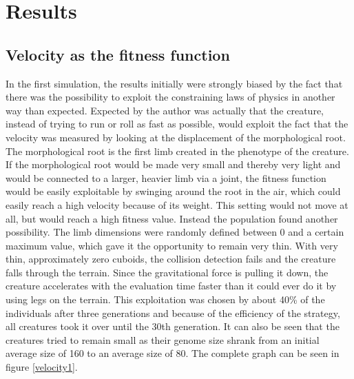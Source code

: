 \documentclass[letterpaper, 10 pt, conference]{ieeeconf}  %
\begin{document}
\section{Results}

\subsection{Velocity as the fitness function}

In the first simulation, the results initially were strongly biased by the fact that there was the possibility to exploit the constraining laws of physics in another way than expected. Expected by the author was actually that the creature, instead of trying to run or roll as fast as possible, would exploit the fact that the velocity was measured by looking at the displacement of the morphological root. The morphological root is the first limb created in the phenotype of the creature. If the morphological root would be made very small and thereby very light and would be connected to a larger, heavier limb via a joint, the fitness function would be easily exploitable by swinging around the root in the air, which could easily reach a high velocity because of its weight. This setting would not move at all, but would reach a high fitness value. Instead the population found another possibility. The limb dimensions were randomly defined between 0 and a certain maximum value, which gave it the opportunity to remain very thin. With very thin, approximately zero cuboids, the collision detection fails and the creature falls through the terrain. Since the gravitational force is pulling it down, the creature accelerates with the evaluation time faster than it could ever do it by using legs on the terrain. This exploitation was chosen by about 40\% of the individuals after three generations and because of the efficiency of the strategy, all creatures took it over until the 30th generation. It can also be seen that the creatures tried to remain small as their genome size shrank from an initial average size of 160 to an average size of 80. The complete graph can be seen in figure \ref{velocity1}.
\end{document}
